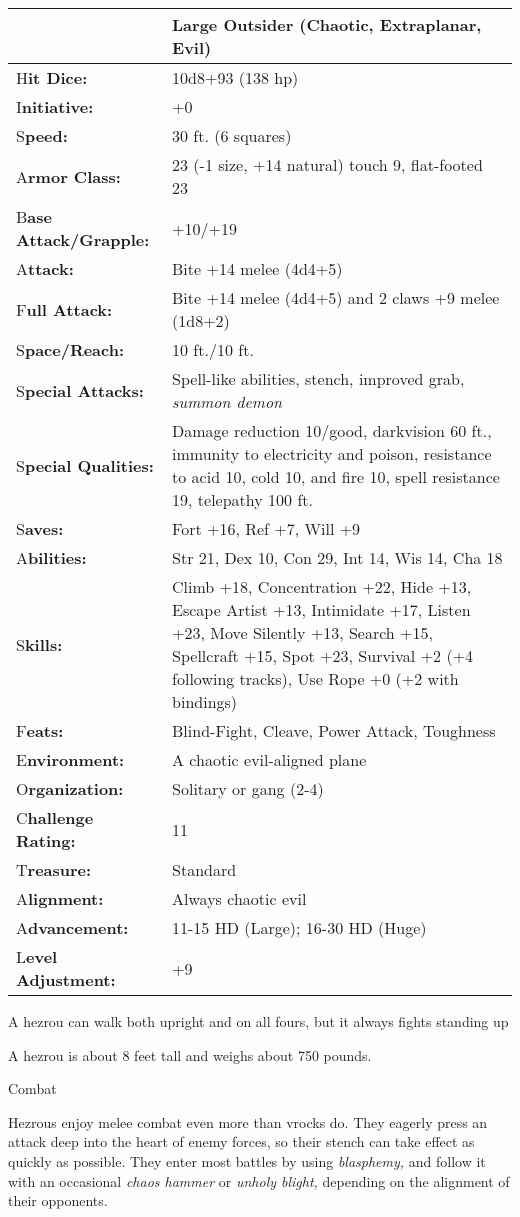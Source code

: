 \documentclass{article}
\begin{document}
\begin{tabular}{|>{\raggedright}p{91pt}|>{\raggedright}p{231pt}|}
\hline
  & Large Outsider (Chaotic, Extraplanar, Evil)\tabularnewline
\hline
H\textbf{it Dice:} & 10d8+93 (138 hp)\tabularnewline
\hline
I\textbf{nitiative:} & +0\tabularnewline
\hline
S\textbf{peed:} & 30 ft. (6 squares)\tabularnewline
\hline
A\textbf{rmor Class:} & 23 (-1 size, +14 natural) touch 9, flat-footed 23\tabularnewline
\hline
B\textbf{ase Attack/Grapple:} & +10/+19\tabularnewline
\hline
A\textbf{ttack:} & Bite +14 melee (4d4+5)\tabularnewline
\hline
F\textbf{ull Attack:} & Bite +14 melee (4d4+5) and 2 claws +9 melee (1d8+2)\tabularnewline
\hline
S\textbf{pace/Reach:} & 10 ft./10 ft.\tabularnewline
\hline
S\textbf{pecial Attacks:} & Spell-like abilities, stench, improved grab, \textit{summon 
demon}\tabularnewline
\hline
S\textbf{pecial Qualities:} & Damage reduction 10/good, darkvision 60 ft., immunity 
to electricity and poison, resistance to acid 10, cold 10, and fire 10, spell resistance 
19, telepathy 100 ft.\tabularnewline
\hline
S\textbf{aves:} & Fort +16, Ref +7, Will +9\tabularnewline
\hline
A\textbf{bilities:} & Str 21, Dex 10, Con 29, Int 14, Wis 14, Cha 18\tabularnewline
\hline
S\textbf{kills:} & Climb +18, Concentration +22, Hide +13, Escape Artist +13, Intimidate 
+17, Listen +23, Move Silently +13, Search +15, Spellcraft +15, Spot +23, Survival 
+2 (+4 following tracks), Use Rope +0 (+2 with bindings)\tabularnewline
\hline
F\textbf{eats:} & Blind-Fight, Cleave, Power Attack, Toughness\tabularnewline
\hline
E\textbf{nvironment:} & A chaotic evil-aligned plane\tabularnewline
\hline
O\textbf{rganization:} & Solitary or gang (2-4)\tabularnewline
\hline
C\textbf{hallenge Rating:} & 11\tabularnewline
\hline
T\textbf{reasure:} & Standard\tabularnewline
\hline
A\textbf{lignment:} & Always chaotic evil\tabularnewline
\hline
A\textbf{dvancement:} & 11-15 HD (Large); 16-30 HD (Huge)\tabularnewline
\hline
L\textbf{evel Adjustment:} & +9\tabularnewline
\hline
\end{tabular}

A hezrou can walk both upright and on all fours, but it always fights standing 
up

A hezrou is about 8 feet tall and weighs about 750 pounds.

Combat

Hezrous enjoy melee combat even more than vrocks do. They eagerly press an attack 
deep into the heart of enemy forces, so their stench can take effect as quickly 
as possible. They enter most battles by using \textit{blasphemy, }and follow it 
with an occasional \textit{chaos hammer }or \textit{unholy blight, }depending on 
the alignment of their opponents.
\end{document}
